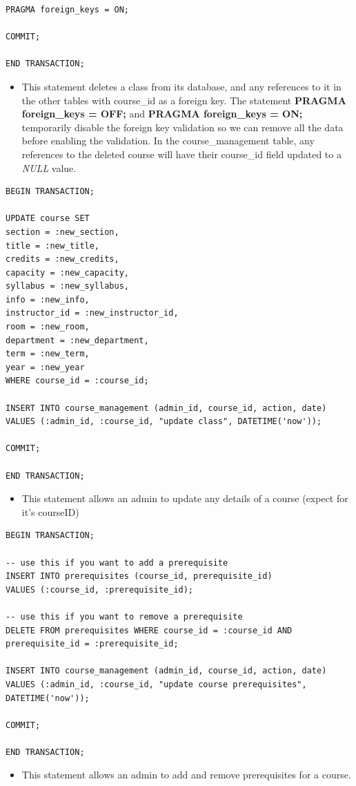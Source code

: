 \documentclass{report}
\begin{document}
\begin{itemize}
\begin{lstlisting}
PRAGMA foreign_keys = ON;

COMMIT;

END TRANSACTION;
    \end{lstlisting}
    \begin{itemize}
        \item This statement deletes a class from its database, and any references to it in the other tables with course\_id as a foreign key. The statement \textbf{PRAGMA foreign\_keys = OFF;} and \textbf{PRAGMA foreign\_keys = ON;} temporarily disable the foreign key validation so we can remove all the data before enabling the validation. In the course\_management table, any references to the deleted course will have their course\_id field updated to a \textit{NULL} value.
    \end{itemize}
    \begin{lstlisting}
BEGIN TRANSACTION;

UPDATE course SET
section = :new_section,
title = :new_title,
credits = :new_credits,
capacity = :new_capacity,
syllabus = :new_syllabus,
info = :new_info,
instructor_id = :new_instructor_id,
room = :new_room,
department = :new_department,
term = :new_term,
year = :new_year
WHERE course_id = :course_id;

INSERT INTO course_management (admin_id, course_id, action, date)
VALUES (:admin_id, :course_id, "update class", DATETIME('now'));

COMMIT;

END TRANSACTION;
    \end{lstlisting}
    \begin{itemize}
        \item This statement allows an admin to update any details of a course (expect for it's courseID)
    \end{itemize}
    \begin{lstlisting}
BEGIN TRANSACTION;

-- use this if you want to add a prerequisite
INSERT INTO prerequisites (course_id, prerequisite_id)
VALUES (:course_id, :prerequisite_id);

-- use this if you want to remove a prerequisite
DELETE FROM prerequisites WHERE course_id = :course_id AND prerequisite_id = :prerequisite_id;

INSERT INTO course_management (admin_id, course_id, action, date)
VALUES (:admin_id, :course_id, "update course prerequisites", DATETIME('now'));

COMMIT;

END TRANSACTION;
    \end{lstlisting}
    \begin{itemize}
        \item This statement allows an admin to add and remove prerequisites for a course.
    \end{itemize}


\end{itemize}
\end{document}

